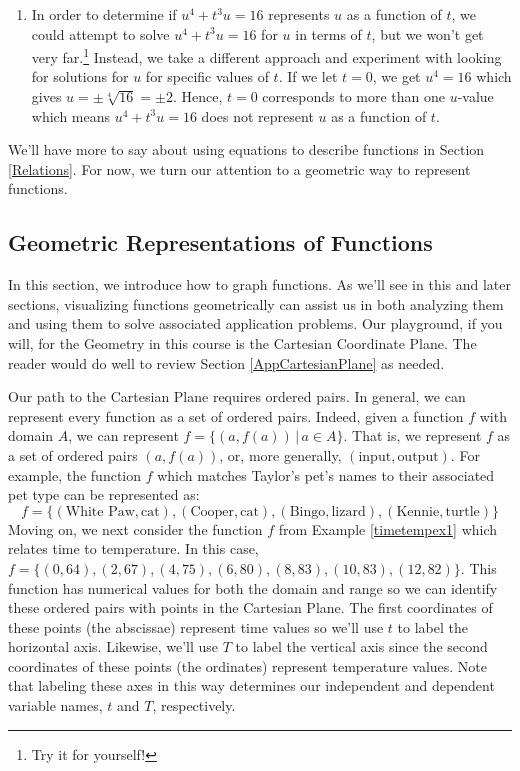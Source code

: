 \documentclass{ximera}
\begin{document}
\begin{example}
\begin{enumerate}
\begin{enumerate}
\item  In order to determine if  $u^{4} + t^{3}u = 16$ represents $u$ as a function of $t$, we could attempt to solve $u^{4} + t^{3}u = 16$ for $u$ in terms of $t$, but we won't get very far.\footnote{Try it for yourself!}  Instead, we take a different approach and experiment with looking for solutions for $u$ for specific values of $t$.  If we let $t = 0$, we get $u^{4} = 16$ which gives $u = \pm \sqrt[4]{16} = \pm 2$.  Hence, $t = 0$ corresponds to more than one $u$-value which means  $u^{4}  +t^{3}u = 16$  does not represent $u$ as a function of $t$.   

\end{enumerate}

\end{enumerate}

\end{example}

We'll have more to say about using equations to describe functions in Section \ref{Relations}.  For now, we turn our attention to a geometric way to represent functions.

\subsection{Geometric Representations of Functions}
\label{geometricrepresentationssection}

In this section, we introduce how to graph functions.  As we'll see in this and later sections, visualizing functions geometrically can assist us in both analyzing them and using them to solve associated application problems.  Our playground, if you will, for the Geometry in this course is the Cartesian Coordinate Plane.  The reader would do well to review Section \ref{AppCartesianPlane} as needed.

 

Our path to the Cartesian Plane requires ordered pairs.  In general, we can represent every function as a set of ordered pairs.  Indeed, given a function $f$ with domain $A$, we can represent $f = \{ (a, f(a)) \, | \, a \in A\}$.  That is, we represent $f$ as a set of ordered pairs $(a, f(a))$, or, more generally, $(\text{input}, \text{output})$.  For example, the function $f$ which matches Taylor's pet's names to their associated pet type can be represented as: \[ f = \{ (\text{White Paw}, \text{cat}), (\text{Cooper}, \text{cat}), (\text{Bingo}, \text{lizard}), (\text{Kennie}, \text{turtle}) \} \] Moving on, we next  consider the function $f$ from Example \ref{timetempex1} which relates time to temperature. In this case,  $f = \{ (0, 64), (2, 67), (4, 75), (6, 80), (8, 83), (10, 83), (12, 82) \}$.   This function has numerical values for both the domain and range so we can identify these ordered pairs with points in the Cartesian Plane.  The first coordinates of these points (the abscissae) represent time values so we'll use $t$ to label the horizontal axis.  Likewise, we'll use $T$ to label the vertical axis since the second coordinates of these points (the ordinates) represent temperature values.  Note that labeling these axes in this way determines our independent and dependent variable names, $t$ and $T$, respectively.
\end{document}
